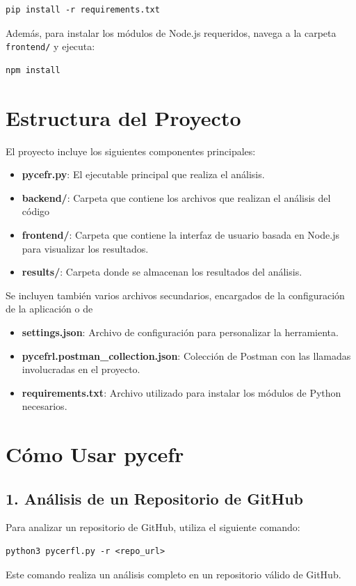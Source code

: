 \documentclass[a4paper, 12pt]{book}
\begin{document}
\begin{verbatim}
pip install -r requirements.txt
\end{verbatim}

Además, para instalar los módulos de Node.js requeridos, navega a la carpeta \texttt{frontend/} y ejecuta:

\begin{verbatim}
npm install
\end{verbatim}

\section{Estructura del Proyecto}
El proyecto incluye los siguientes componentes principales:

\begin{itemize}
    \item \textbf{pycefr.py}: El ejecutable principal que realiza el análisis.
    \item \textbf{backend/}: Carpeta que contiene los archivos que realizan el análisis del código
    \item \textbf{frontend/}: Carpeta que contiene la interfaz de usuario basada en Node.js para visualizar los resultados.
    \item \textbf{results/}: Carpeta donde se almacenan los resultados del análisis.
\end{itemize}

Se incluyen también varios archivos secundarios, encargados de la configuración de la aplicación o de 
\begin{itemize}
    \item \textbf{settings.json}: Archivo de configuración para personalizar la herramienta.
    \item \textbf{pycefrl.postman\_collection.json}: Colección de Postman con las llamadas involucradas en el proyecto.
    \item \textbf{requirements.txt}: Archivo utilizado para instalar los módulos de Python necesarios.
\end{itemize}

\section{Cómo Usar pycefr}

\subsection{1. Análisis de un Repositorio de GitHub}
Para analizar un repositorio de GitHub, utiliza el siguiente comando:
\begin{verbatim}
python3 pycerfl.py -r <repo_url>
\end{verbatim}
Este comando realiza un análisis completo en un repositorio válido de GitHub.
\end{document}
